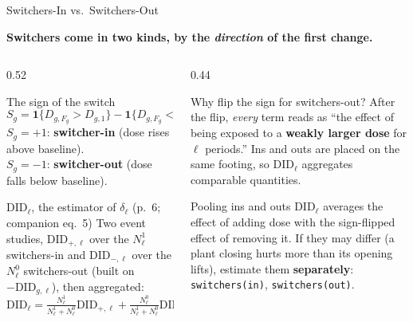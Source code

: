 \documentclass[main.tex]{subfiles}
\begin{document}
\begin{frame}{Switchers-In vs.\ Switchers-Out}

  \textbf{Switchers come in two kinds, by the \emph{direction} of the first
  change.}

  \medskip
  \begin{columns}[T]
    \begin{column}{0.52\textwidth}
      \begin{block}{The sign of the switch}
        \[
          S_g = \mathbf{1}\{D_{g,F_g}>D_{g,1}\} - \mathbf{1}\{D_{g,F_g}<D_{g,1}\}
        \]
        \footnotesize
        $S_g=+1$: \textbf{switcher-in} (dose rises above baseline).\\
        $S_g=-1$: \textbf{switcher-out} (dose falls below baseline).
      \end{block}

      \smallskip
      \begin{defbox}{$\text{DID}_\ell$, the estimator of $\delta_\ell$ (p.~6; companion eq.~5)}
        \footnotesize
        Two event studies, $\text{DID}_{+,\ell}$ over the $N^1_\ell$
        switchers-in and $\text{DID}_{-,\ell}$ over the $N^0_\ell$
        switchers-out (built on $-\text{DID}_{g,\ell}$), then aggregated:
        \[
          \text{DID}_\ell = \tfrac{N^1_\ell}{N^1_\ell+N^0_\ell}\text{DID}_{+,\ell}
            + \tfrac{N^0_\ell}{N^1_\ell+N^0_\ell}\text{DID}_{-,\ell}.
        \]
      \end{defbox}
    \end{column}
    \begin{column}{0.44\textwidth}
      \begin{exampleblock}{Why flip the sign for switchers-out?}
        \footnotesize
        After the flip, \emph{every} term reads as ``the effect of being
        exposed to a \textbf{weakly larger dose} for $\ell$ periods.''
        Ins and outs are placed on the same footing, so $\text{DID}_\ell$
        aggregates comparable quantities.
      \end{exampleblock}

      \smallskip
      \begin{alertblock}{Pooling ins and outs}
        \footnotesize
        $\text{DID}_\ell$ averages the effect of adding dose with the
        sign-flipped effect of removing it. If they may differ (a plant
        closing hurts more than its opening lifts), estimate them
        \textbf{separately}: \texttt{switchers(in)}, \texttt{switchers(out)}.
      \end{alertblock}
    \end{column}
  \end{columns}

\end{frame}
\end{document}
